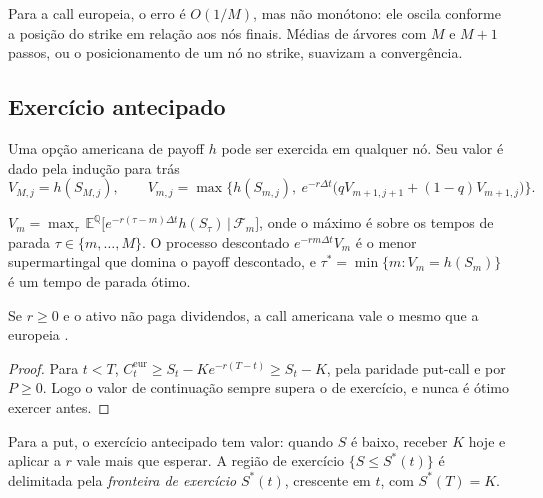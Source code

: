 \begin{observacao}
Para a call europeia, o erro é $O(1/M)$, mas não monótono: ele oscila conforme a posição do strike em relação aos nós finais. Médias de árvores com $M$ e $M+1$ passos, ou o posicionamento de um nó no strike, suavizam a convergência.
\end{observacao}

\subsection{Exercício antecipado}

\begin{definicao}
Uma opção americana de payoff $h$ pode ser exercida em qualquer nó. Seu valor é dado pela indução para trás
\begin{equation}
V_{M,j}=h(S_{M,j}),\qquad V_{m,j}=\max\Big\{h(S_{m,j}),\ e^{-r\Delta t}\big(qV_{m+1,j+1}+(1-q)V_{m+1,j}\big)\Big\}.
\end{equation}
\end{definicao}

\begin{teorema}
$V_{m}=\max_{\tau}\,\mathbb E^{\mathbb Q}\big[e^{-r(\tau-m)\Delta t}h(S_\tau)\,\big|\,\mathcal F_m\big]$, onde o máximo é sobre os tempos de parada $\tau\in\{m,\dots,M\}$. O processo descontado $e^{-rm\Delta t}V_m$ é o menor supermartingal que domina o payoff descontado, e $\tau^*=\min\{m:V_m=h(S_m)\}$ é um tempo de parada ótimo.
\end{teorema}

\begin{proposicao}
Se $r\ge0$ e o ativo não paga dividendos, a call americana vale o mesmo que a europeia \citep{merton1973}.
\end{proposicao}

\begin{proof}
Para $t<T$, $C^{\mathrm{eur}}_t\ge S_t-Ke^{-r(T-t)}\ge S_t-K$, pela paridade put-call e por $P\ge0$. Logo o valor de continuação sempre supera o de exercício, e nunca é ótimo exercer antes.
\end{proof}

Para a put, o exercício antecipado tem valor: quando $S$ é baixo, receber $K$ hoje e aplicar a $r$ vale mais que esperar. A região de exercício $\{S\le S^*(t)\}$ é delimitada pela \emph{fronteira de exercício} $S^*(t)$, crescente em $t$, com $S^*(T)=K$.

